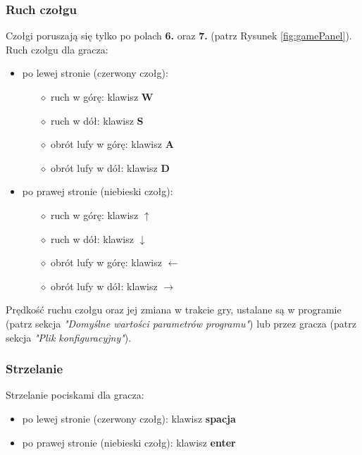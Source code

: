\documentclass[a4paper]{article}
\begin{document}
\subsubsection{Ruch czo\l{}gu}
\quad Czo\l{}gi poruszaj\k{a} si\k{e} tylko po polach \textbf{6.} oraz \textbf{7.} (patrz Rysunek \ref{fig:gamePanel}).
Ruch czo\l{}gu dla gracza:
\begin{itemize}
    \item po lewej stronie (czerwony czo\l{}g):
    \begin{itemize}
        \item[$\diamond$] ruch w g\'or\k{e}: klawisz \textbf{W}
        \item[$\diamond$] ruch w d\'o\l{}: klawisz \textbf{S}
        \item[$\diamond$] obr\'ot lufy w g\'or\k{e}: klawisz \textbf{A}
        \item[$\diamond$] obr\'ot lufy w d\'o\l{}: klawisz \textbf{D}
    \end{itemize}
    \item po prawej stronie (niebieski czo\l{}g):
    \begin{itemize}
        \item[$\diamond$] ruch w g\'or\k{e}: klawisz \textbf{$\uparrow$}
        \item[$\diamond$] ruch w d\'o\l{}: klawisz \textbf{$\downarrow$}
        \item[$\diamond$] obr\'ot lufy w g\'or\k{e}: klawisz \textbf{$\leftarrow$}
        \item[$\diamond$] obr\'ot lufy w d\'o\l{}: klawisz \textbf{$\rightarrow$}
    \end{itemize}
\end{itemize}

Pr\k{e}dko\'s\'c ruchu czo\l{}gu oraz jej zmiana w trakcie gry, ustalane s\k{a} w programie (patrz sekcja \textit{"Domy\'slne warto\'sci parametr\'ow programu"}) lub przez gracza (patrz sekcja \textit{"Plik konfiguracyjny"}). 

\subsubsection{Strzelanie}
\quad Strzelanie pociskami dla gracza:
\begin{itemize}
    \item po lewej stronie (czerwony czo\l{}g): klawisz \textbf{spacja}
    \item po prawej stronie (niebieski czo\l{}g): klawisz \textbf{enter}
\end{itemize}
\end{document}
